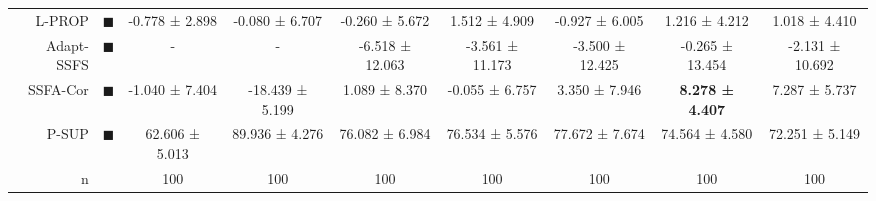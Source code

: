 \begin{tabular}{rcccccccc}
L-PROP     &                     \textcolor{LABEL_PROPAGATION}{\LARGE $\blacksquare$} &          -0.778 ± 2.898 &          -0.080 ± 6.707 &           -0.260 ± 5.672 &           1.512 ± 4.909 &          -0.927 ± 6.005 &           1.216 ± 4.212 &            1.018 ± 4.410 \\
Adapt-SSFS &                              \textcolor{ASSFSCMR}{\LARGE $\blacksquare$} &               - &               - &          -6.518 ± 12.063 &         -3.561 ± 11.173 &         -3.500 ± 12.425 &         -0.265 ± 13.454 &          -2.131 ± 10.692 \\
SSFA-Cor   &                              \textcolor{SFAMCAMT}{\LARGE $\blacksquare$} &          -1.040 ± 7.404 &         -18.439 ± 5.199 &            1.089 ± 8.370 &          -0.055 ± 6.757 &           3.350 ± 7.946 &  \textbf{8.278 ± 4.407} &            7.287 ± 5.737 \\
P-SUP      &         \textcolor{PARTIAL_SUPERVISED_CLASSIFIER}{\LARGE $\blacksquare$} &          62.606 ± 5.013 &          89.936 ± 4.276 &           76.082 ± 6.984 &          76.534 ± 5.576 &          77.672 ± 7.674 &          74.564 ± 4.580 &           72.251 ± 5.149 \\
n          &                                                                          &                     100 &                     100 &                      100 &                     100 &                     100 &                     100 &                      100 \\
\bottomrule
\end{tabular}
